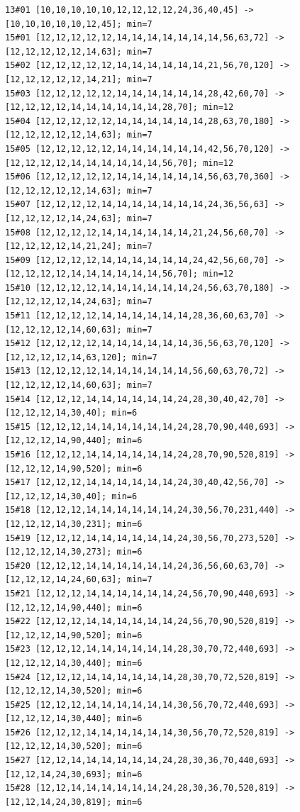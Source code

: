 \documentclass[11pt,a4paper]{article}
\begin{document}
\begin{Verbatim}[breaklines,breakanywhere,fontsize=\footnotesize]
13#01 [10,10,10,10,10,12,12,12,12,24,36,40,45] -> [10,10,10,10,10,12,45]; min=7
15#01 [12,12,12,12,12,14,14,14,14,14,14,14,56,63,72] -> [12,12,12,12,12,14,63]; min=7
15#02 [12,12,12,12,12,14,14,14,14,14,14,21,56,70,120] -> [12,12,12,12,12,14,21]; min=7
15#03 [12,12,12,12,12,14,14,14,14,14,14,28,42,60,70] -> [12,12,12,12,14,14,14,14,14,14,28,70]; min=12
15#04 [12,12,12,12,12,14,14,14,14,14,14,28,63,70,180] -> [12,12,12,12,12,14,63]; min=7
15#05 [12,12,12,12,12,14,14,14,14,14,14,42,56,70,120] -> [12,12,12,12,14,14,14,14,14,14,56,70]; min=12
15#06 [12,12,12,12,12,14,14,14,14,14,14,56,63,70,360] -> [12,12,12,12,12,14,63]; min=7
15#07 [12,12,12,12,14,14,14,14,14,14,14,24,36,56,63] -> [12,12,12,12,14,24,63]; min=7
15#08 [12,12,12,12,14,14,14,14,14,14,21,24,56,60,70] -> [12,12,12,12,14,21,24]; min=7
15#09 [12,12,12,12,14,14,14,14,14,14,24,42,56,60,70] -> [12,12,12,12,14,14,14,14,14,14,56,70]; min=12
15#10 [12,12,12,12,14,14,14,14,14,14,24,56,63,70,180] -> [12,12,12,12,14,24,63]; min=7
15#11 [12,12,12,12,14,14,14,14,14,14,28,36,60,63,70] -> [12,12,12,12,14,60,63]; min=7
15#12 [12,12,12,12,14,14,14,14,14,14,36,56,63,70,120] -> [12,12,12,12,14,63,120]; min=7
15#13 [12,12,12,12,14,14,14,14,14,14,56,60,63,70,72] -> [12,12,12,12,14,60,63]; min=7
15#14 [12,12,12,14,14,14,14,14,14,24,28,30,40,42,70] -> [12,12,12,14,30,40]; min=6
15#15 [12,12,12,14,14,14,14,14,14,24,28,70,90,440,693] -> [12,12,12,14,90,440]; min=6
15#16 [12,12,12,14,14,14,14,14,14,24,28,70,90,520,819] -> [12,12,12,14,90,520]; min=6
15#17 [12,12,12,14,14,14,14,14,14,24,30,40,42,56,70] -> [12,12,12,14,30,40]; min=6
15#18 [12,12,12,14,14,14,14,14,14,24,30,56,70,231,440] -> [12,12,12,14,30,231]; min=6
15#19 [12,12,12,14,14,14,14,14,14,24,30,56,70,273,520] -> [12,12,12,14,30,273]; min=6
15#20 [12,12,12,14,14,14,14,14,14,24,36,56,60,63,70] -> [12,12,12,14,24,60,63]; min=7
15#21 [12,12,12,14,14,14,14,14,14,24,56,70,90,440,693] -> [12,12,12,14,90,440]; min=6
15#22 [12,12,12,14,14,14,14,14,14,24,56,70,90,520,819] -> [12,12,12,14,90,520]; min=6
15#23 [12,12,12,14,14,14,14,14,14,28,30,70,72,440,693] -> [12,12,12,14,30,440]; min=6
15#24 [12,12,12,14,14,14,14,14,14,28,30,70,72,520,819] -> [12,12,12,14,30,520]; min=6
15#25 [12,12,12,14,14,14,14,14,14,30,56,70,72,440,693] -> [12,12,12,14,30,440]; min=6
15#26 [12,12,12,14,14,14,14,14,14,30,56,70,72,520,819] -> [12,12,12,14,30,520]; min=6
15#27 [12,12,14,14,14,14,14,14,24,28,30,36,70,440,693] -> [12,12,14,24,30,693]; min=6
15#28 [12,12,14,14,14,14,14,14,24,28,30,36,70,520,819] -> [12,12,14,24,30,819]; min=6

\end{Verbatim}
\end{document}
